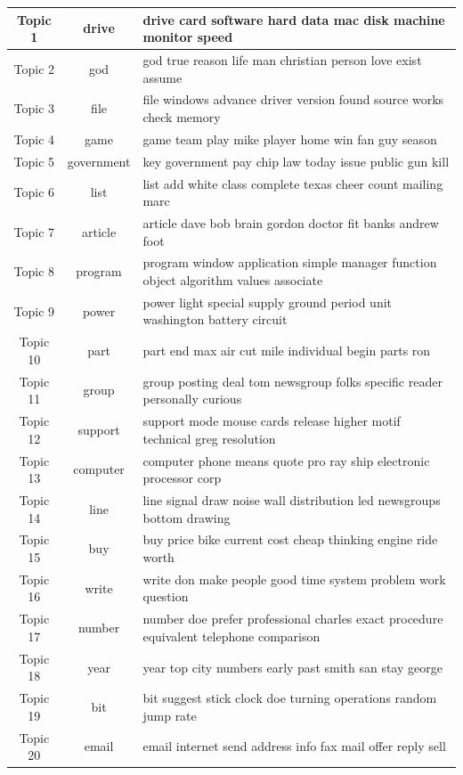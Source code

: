 \documentclass{article}
\begin{document}
\begin{table}[h]
\begin{center}
\begin{tabular}{|c|c|l|}
Topic	1	&	drive & drive card software hard data mac disk machine monitor speed	\\ \hline
Topic	2	&	god & god true reason life man christian person love exist assume	\\ \hline
Topic	3	&	file & file windows advance driver version found source works check memory	\\ \hline
Topic	4	&	game & game team play mike player home win fan guy season	\\ \hline
Topic	5	&	government & key government pay chip law today issue public gun kill	\\ \hline
Topic	6	&	list & list add white class complete texas cheer count mailing marc	\\ \hline
Topic	7	&	article & article dave bob brain gordon doctor fit banks andrew foot	\\ \hline
Topic	8	&	program & program window application simple manager function object algorithm values associate	\\ \hline
Topic	9	&	power & power light special supply ground period unit washington battery circuit	\\ \hline
Topic	10	&	part & part end max air cut mile individual begin parts ron	\\ \hline
Topic	11	&	group & group posting deal tom newsgroup folks specific reader personally curious	\\ \hline
Topic	12	&	support & support mode mouse cards release higher motif technical greg resolution	\\ \hline
Topic	13	&	computer & computer phone means quote pro ray ship electronic processor corp	\\ \hline
Topic	14	&	line & line signal draw noise wall distribution led newsgroups bottom drawing	\\ \hline
Topic	15	&	buy & buy price bike current cost cheap thinking engine ride worth	\\ \hline
Topic	16	&	write & write don make people good time system problem work question	\\ \hline
Topic	17	&	number & number doe prefer professional charles exact procedure equivalent telephone comparison	\\ \hline
Topic	18	&	year & year top city numbers early past smith san stay george	\\ \hline
Topic	19	&	bit & bit suggest stick clock doe turning operations random jump rate	\\ \hline
Topic	20	&	email & email internet send address info fax mail offer reply sell	\\ \hline

\end{tabular}
\end{center}
\end{table}
\end{document}
